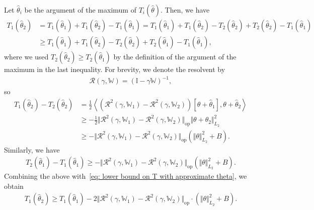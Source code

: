 \documentclass[11pt]{article}
\newcommand{\op}{\mathrm{op}}
\newcommand{\bbW}{\mathbb{W}}
\newcommand{\cR}{\mathcal{R}}
\newcommand{\bbI}{\mathbb{I}}
\newcommand{\<}{\langle}
\renewcommand{\>}{\rangle}
\theoremstyle{plain}
\theoremstyle{definition}
\theoremstyle{remark}
\begin{document}
Let $\hat{\theta}_i$ be the argument of the maximum of $T_i(\hat{\theta})$. Then, we have
\begin{align}
    T_{1}(\hat{\theta}_2) & = T_1(\hat{\theta}_1) + T_{1}(\hat{\theta}_2) - T_{1}(\hat{\theta}_1) = T_1(\hat{\theta}_1) + T_1(\hat{\theta}_2) - T_2(\hat{\theta}_2) + T_2(\hat{\theta}_2) - T_1(\hat{\theta}_1) \nonumber \\
    & \ge  T_1(\hat{\theta}_1) + T_1(\hat{\theta}_2) - T_2(\hat{\theta}_2) + T_2(\hat{\theta}_1) - T_1(\hat{\theta}_1), \label{eq: lower bound on T with approximate theta}
\end{align}
where we used $T_2(\hat{\theta}_2) \ge T_2(\hat{\theta}_1)$ by the definition of the argument of the maximum in the last inequality. For brevity, we denote the resolvent by
\begin{align*}
    \cR(\gamma, \bbW) = (\bbI - \gamma \bbW)^{-1},
\end{align*}
so
\begin{align*}
    T_1(\widehat{\theta}_2) - T_2(\widehat{\theta}_2) & = \frac{1}{2} \left \langle (\cR^2(\gamma, \bbW_1) - \cR^2(\gamma, \bbW_2)) [\theta + \hat{\theta}_1], \theta + \hat{\theta}_2 \right \rangle \\
    & \ge -  \frac{1}{2} \Vert \cR^2(\gamma, \bbW_1) - \cR^2(\gamma, \bbW_2) \Vert_{\op} \Vert \theta + \theta_2 \Vert_{L_2}^2 \\
    & \ge -  \Vert \cR^2(\gamma, \bbW_1) - \cR^2(\gamma, \bbW_2) \Vert_{\op} (\Vert \theta \Vert^2_{L_2} + B).
\end{align*}
Similarly, we have
\begin{align*}
    T_2(\hat{\theta}_1) - T_1(\hat{\theta}_1) \ge - \Vert \cR^2(\gamma, \bbW_1) - \cR^2(\gamma, \bbW_2) \Vert_{\op} (\Vert \theta \Vert^2_{L_2} + B).
\end{align*}
Combining the above with~\eqref{eq: lower bound on T with approximate theta}, we obtain
\begin{align}
\label{eq: T stability throw resolvents difference}
    T_1(\hat{\theta}_2) \ge T_1(\hat{\theta}_1) - 2 \Vert \cR^2(\gamma, \bbW_1) - \cR^2(\gamma, \bbW_2) \Vert_{\op} \cdot (\Vert \theta \Vert_{L_2}^2 + B).
\end{align}
\end{document}
